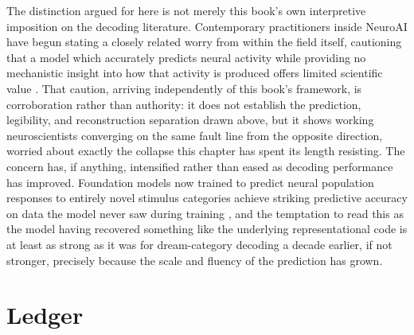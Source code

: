 \documentclass[11pt]{book}
\begin{document}
The distinction argued for here is not merely this book's own interpretive imposition on the decoding literature. Contemporary practitioners inside NeuroAI have begun stating a closely related worry from within the field itself, cautioning that a model which accurately predicts neural activity while providing no mechanistic insight into how that activity is produced offers limited scientific value \cite{sadehclopath2025}. That caution, arriving independently of this book's framework, is corroboration rather than authority: it does not establish the prediction, legibility, and reconstruction separation drawn above, but it shows working neuroscientists converging on the same fault line from the opposite direction, worried about exactly the collapse this chapter has spent its length resisting. The concern has, if anything, intensified rather than eased as decoding performance has improved. Foundation models now trained to predict neural population responses to entirely novel stimulus categories achieve striking predictive accuracy on data the model never saw during training \cite{wang2025foundation}, and the temptation to read this as the model having recovered something like the underlying representational code is at least as strong as it was for dream-category decoding a decade earlier, if not stronger, precisely because the scale and fluency of the prediction has grown.

\section{Ledger}
\end{document}
